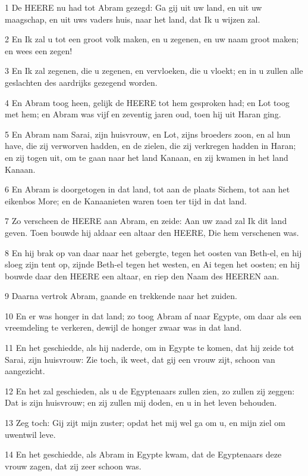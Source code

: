 \par 1 De HEERE nu had tot Abram gezegd: Ga gij uit uw land, en uit uw maagschap, en uit uws vaders huis, naar het land, dat Ik u wijzen zal.
\par 2 En Ik zal u tot een groot volk maken, en u zegenen, en uw naam groot maken; en wees een zegen!
\par 3 En Ik zal zegenen, die u zegenen, en vervloeken, die u vloekt; en in u zullen alle geslachten des aardrijks gezegend worden.
\par 4 En Abram toog heen, gelijk de HEERE tot hem gesproken had; en Lot toog met hem; en Abram was vijf en zeventig jaren oud, toen hij uit Haran ging.
\par 5 En Abram nam Sarai, zijn huisvrouw, en Lot, zijns broeders zoon, en al hun have, die zij verworven hadden, en de zielen, die zij verkregen hadden in Haran; en zij togen uit, om te gaan naar het land Kanaan, en zij kwamen in het land Kanaan.
\par 6 En Abram is doorgetogen in dat land, tot aan de plaats Sichem, tot aan het eikenbos More; en de Kanaanieten waren toen ter tijd in dat land.
\par 7 Zo verscheen de HEERE aan Abram, en zeide: Aan uw zaad zal Ik dit land geven. Toen bouwde hij aldaar een altaar den HEERE, Die hem verschenen was.
\par 8 En hij brak op van daar naar het gebergte, tegen het oosten van Beth-el, en hij sloeg zijn tent op, zijnde Beth-el tegen het westen, en Ai tegen het oosten; en hij bouwde daar den HEERE een altaar, en riep den Naam des HEEREN aan.
\par 9 Daarna vertrok Abram, gaande en trekkende naar het zuiden.
\par 10 En er was honger in dat land; zo toog Abram af naar Egypte, om daar als een vreemdeling te verkeren, dewijl de honger zwaar was in dat land.
\par 11 En het geschiedde, als hij naderde, om in Egypte te komen, dat hij zeide tot Sarai, zijn huisvrouw: Zie toch, ik weet, dat gij een vrouw zijt, schoon van aangezicht.
\par 12 En het zal geschieden, als u de Egyptenaars zullen zien, zo zullen zij zeggen: Dat is zijn huisvrouw; en zij zullen mij doden, en u in het leven behouden.
\par 13 Zeg toch: Gij zijt mijn zuster; opdat het mij wel ga om u, en mijn ziel om uwentwil leve.
\par 14 En het geschiedde, als Abram in Egypte kwam, dat de Egyptenaars deze vrouw zagen, dat zij zeer schoon was.
